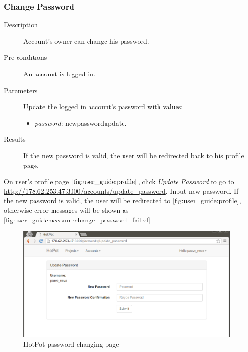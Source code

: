 \subsubsection{Change Password}
\label{ch:result:user_guide:account:change_password}

\begin{description}
\item[Description] Account's owner can change his password.
\item[Pre-conditions] An account is logged in.
\item[Parameters] Update the logged in account's password with values:
\begin{itemize}
\item \emph{password}: newpasswordupdate.
\end{itemize}
\item[Results] If the new password is valid, the user will be redirected back to his profile page.
\end{description}

On user's profile page \(\autoref{fig:user_guide:profile}\), click \emph{Update Password} to go to \href{http://178.62.253.47:3000/accounts/update\_password}{http://178.62.253.47:3000/accounts/update\_password}.
Input new password.
If the new password is valid, the user will be redirected to \autoref{fig:user_guide:profile}, otherwise error messages will be shown as \autoref{fig:user_guide:account:change_password_failed}.

\begin{figure}[bth]
\myfloatalign
\includegraphics[width=1.0\linewidth]{gfx/chapter_5/account/change_password}
\caption[HotPot password changing page]{HotPot password changing page}
\label{fig:user_guide:account:change_password}
\end{figure}

